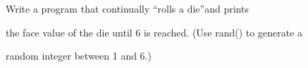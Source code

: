 Write a program that continually ``rolls a die''and prints

the face value of the die until 6 is reached. (Use rand() to generate a

random integer between 1 and 6.)

